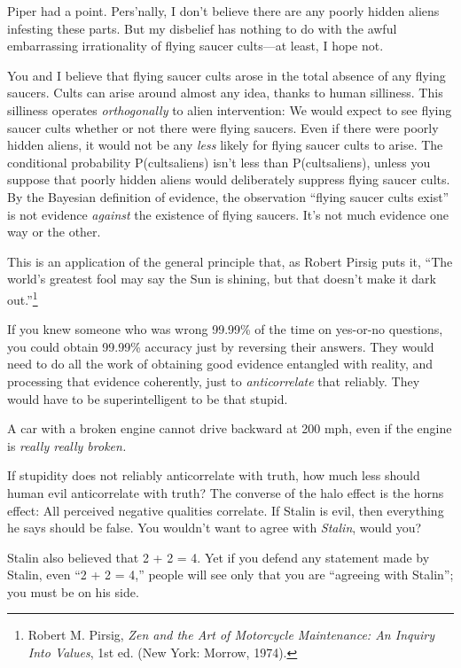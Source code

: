 {
 Piper had a point. Pers'nally, I
don't believe there are any poorly hidden aliens
infesting these parts. But my disbelief has nothing to do with the
awful embarrassing irrationality of flying saucer cults---at least, I
hope not.}

{
 You and I believe that flying saucer cults arose in the total
absence of any flying saucers. Cults can arise around almost any idea,
thanks to human silliness. This silliness operates
\textit{orthogonally} to alien intervention: We would expect to see
flying saucer cults whether or not there were flying saucers. Even if
there were poorly hidden aliens, it would not be any \textit{less}
likely for flying saucer cults to arise. The conditional probability
P(cults{\textbar}aliens) isn't less than
P(cults{\textbar}{\textlnot}aliens), unless you suppose that poorly
hidden aliens would deliberately suppress flying saucer cults. By the
Bayesian definition of evidence, the observation
``flying saucer cults exist'' is not
evidence \textit{against} the existence of flying saucers.
It's not much evidence one way or the other.}

{
 This is an application of the general principle that, as Robert
Pirsig puts it, ``The world's greatest
fool may say the Sun is shining, but that doesn't make
it dark out.''\footnote{Robert M. Pirsig, \textit{Zen and the Art of Motorcycle
Maintenance: An Inquiry Into Values}, 1st ed. (New York: Morrow,
1974).}}

{
 If you knew someone who was wrong 99.99\% of the time on yes-or-no
questions, you could obtain 99.99\% accuracy just by reversing their
answers. They would need to do all the work of obtaining good evidence
entangled with reality, and processing that evidence coherently, just
to \textit{anticorrelate} that reliably. They would have to be
superintelligent to be that stupid.}

{
 A car with a broken engine cannot drive backward at 200 mph, even
if the engine is \textit{really really broken.}}

{
 If stupidity does not reliably anticorrelate with truth, how much
less should human evil anticorrelate with truth? The converse of the
halo effect is the horns effect: All perceived negative qualities
correlate. If Stalin is evil, then everything he says should be false.
You wouldn't want to agree with \textit{Stalin}, would
you?}

{
 Stalin also believed that 2 + 2 = 4. Yet if you defend any
statement made by Stalin, even ``2 + 2 =
4,'' people will see only that you are
``agreeing with Stalin''; you must
be on his side.}

